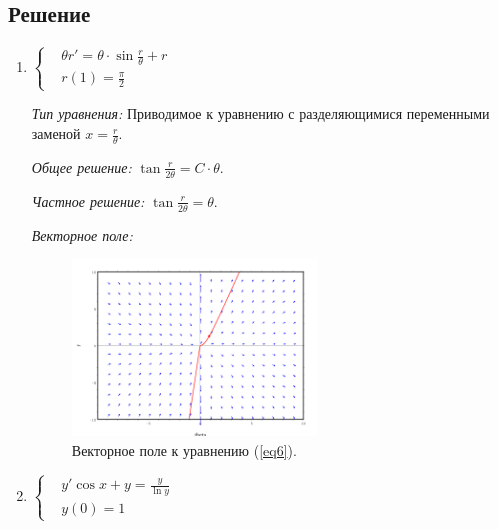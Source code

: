 \documentclass[14pt, a4paper, titlepage, fleqn]{extarticle}
\begin{document}
        \subsection{Решение}

            \begin{enumerate}
                \item \(
                        \left\lbrace
                        \begin{aligned}
                            &\theta r' = \theta \cdot \sin{\frac{r}{\theta}} + r \\
                            &r(1) = \frac{\pi}{2}
                        \end{aligned}
                        \right.
                    \) \label{eq6}

                    \textit{Тип уравнения:}
                        Приводимое к уравнению с разделяющимися переменными 
                        заменой \( \displaystyle x = \frac{r}{\theta} \).

                    \textit{Общее решение:}
                        \(
                            \displaystyle
                            \tan{\frac{r}{2\theta}} = C \cdot \theta.
                        \)

                    \textit{Частное решение:}
                        \(
                            \displaystyle
                            \tan{\frac{r}{2\theta}} = \theta.
                        \)

                    \textit{Векторное поле:}

                        \begin{figure}[H]
                            \centering
                            \includegraphics[width=6.5cm]{pictures/vector_field_6.pdf}
                            \caption{Векторное поле к уравнению (\ref{eq6}).}
                        \end{figure}

                \item \(
                        \left\lbrace
                        \begin{aligned}
                            &y' \cos{x} + y = \frac{y}{\ln{y}} \\
                            &y(0) = 1 
                        \end{aligned}
                        \right.
                    \) \label{eq7}


\end{enumerate}
\end{document}
